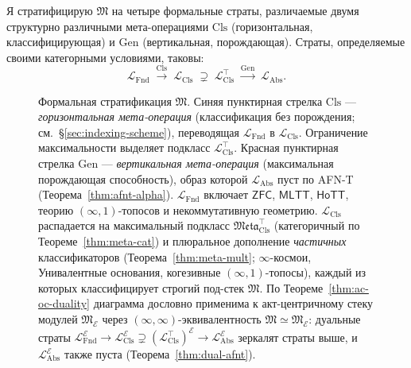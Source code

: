 \documentclass[11pt]{article}
\theoremstyle{plain}
\theoremstyle{definition}
\newcommand{\fM}{\mathfrak{M}}
\newcommand{\Meta}{\mathfrak{Meta}}
\newcommand{\LFnd}{\mathcal{L}_{\mathrm{Fnd}}}
\newcommand{\LCls}{\mathcal{L}_{\mathrm{Cls}}}
\newcommand{\LClsMax}{\mathcal{L}_{\mathrm{Cls}}^{\top}}
\newcommand{\LAbs}{\mathcal{L}_{\mathrm{Abs}}}
\newcommand{\ZFC}{\mathsf{ZFC}}
\newcommand{\MLTT}{\mathsf{MLTT}}
\newcommand{\HoTT}{\mathsf{HoTT}}
\newcommand{\cE}{\mathcal{E}}
\newcommand{\LAbsE}{\LAbs^{\cE}}
\newcommand{\LClsE}{\LCls^{\cE}}
\newcommand{\LClsMaxE}{(\LClsMax)^{\cE}}
\newcommand{\LFndE}{\LFnd^{\cE}}
\begin{document}
Я стратифицирую $\fM$ на четыре формальные страты, различаемые двумя структурно различными мета-операциями $\mathrm{Cls}$ (горизонтальная, классифицирующая) и $\mathrm{Gen}$ (вертикальная, порождающая). Страты, определяемые своими категорными условиями, таковы:
\[
\LFnd \;\xrightarrow{\mathrm{Cls}}\; \LCls \;\supsetneq\; \LClsMax \;\xrightarrow{\mathrm{Gen}}\; \LAbs.
\]

\begin{figure}[ht]
\centering
{}
\caption{Формальная стратификация $\fM$. Синяя пунктирная стрелка $\mathrm{Cls}$ — \emph{горизонтальная мета-операция} (классификация без порождения; см.\ \S\ref{sec:indexing-scheme}), переводящая $\LFnd$ в $\LCls$. Ограничение максимальности выделяет подкласс $\LClsMax$. Красная пунктирная стрелка $\mathrm{Gen}$ — \emph{вертикальная мета-операция} (максимальная порождающая способность), образ которой $\LAbs$ пуст по AFN-T (Теорема~\ref{thm:afnt-alpha}). $\LFnd$ включает $\ZFC$, $\MLTT$, $\HoTT$, теорию $(\infty, 1)$-топосов и некоммутативную геометрию. $\LCls$ распадается на максимальный подкласс $\Meta_{\mathrm{Cls}}^{\top}$ (категоричный по Теореме~\ref{thm:meta-cat}) и плюральное дополнение \emph{частичных} классификаторов (Теорема~\ref{thm:meta-mult}; $\infty$-космои, Унивалентные основания, когезивные $(\infty, 1)$-топосы), каждый из которых классифицирует строгий под-стек $\fM$. По Теореме~\ref{thm:ac-oc-duality} диаграмма дословно применима к акт-центричному стеку модулей $\fM_\cE$ через $(\infty, \infty)$-эквивалентность $\fM \simeq \fM_\cE$: дуальные страты $\LFndE \to \LClsE \supsetneq \LClsMaxE \to \LAbsE$ зеркалят страты выше, и $\LAbsE$ также пуста (Теорема~\ref{thm:dual-afnt}).}
\label{fig:hierarchy}
\end{figure}
\end{document}
